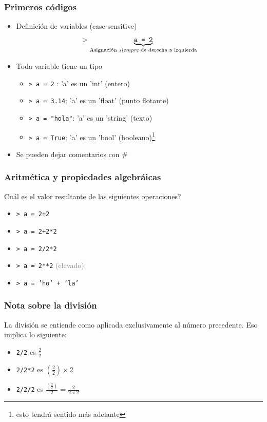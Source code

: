\documentclass[14pt,aspectratio=169,xcolor=dvipsnames]{beamer}
\begin{document}
\begin{frame}[t]\frametitle{Primeros códigos}
    \begin{itemize}
        \item Definición de variables (case sensitive)
            $$ > \underbrace{\texttt{a = 2}}_\text{Asignación \emph{siempre} de derecha a izquierda} $$
        \item Toda variable tiene un tipo 
            \begin{itemize}
                \item \texttt{> a = 2} : 'a' es un 'int' (entero)
                \item \texttt{> a = 3.14}: 'a' es un 'float' (punto flotante)
                \item \texttt{> a = "hola"}: 'a' es un 'string' (texto)
                \item \texttt{> a = True}: 'a' es un 'bool' (booleano)\footnote{esto tendrá sentido más adelante}
            \end{itemize}
        \item Se pueden dejar comentarios con \#
    \end{itemize}

\end{frame}
\begin{frame}\frametitle{Aritmética y propiedades algebráicas}
Cuál es el valor resultante de las siguientes operaciones? 

\vspace{1cm}
    \begin{itemize}
        \item \texttt{> a = 2+2}
        \item \texttt{> a = 2+2*2}
        \item \texttt{> a = 2/2*2}
        \item \texttt{> a = 2**2}   \textcolor{gray}{(elevado)}
        \item \texttt{> a = 'ho' + 'la'}
    \end{itemize}


\end{frame}
\begin{frame}\frametitle{Nota sobre la división}
La división se entiende como aplicada exclusivamente al número precedente. Eso implica lo siguiente: 
    \begin{itemize}
        \item \texttt{2/2} es $\frac 2 2$
        \item \texttt{2/2*2} es $\left(\frac 2 2\right) \times 2$
        \item \texttt{2/2/2} es $\frac{\left(\frac 2 2\right)}{2}= \frac{2}{2\times 2}$
    \end{itemize}

\pause {}
\end{frame}
\end{document}
